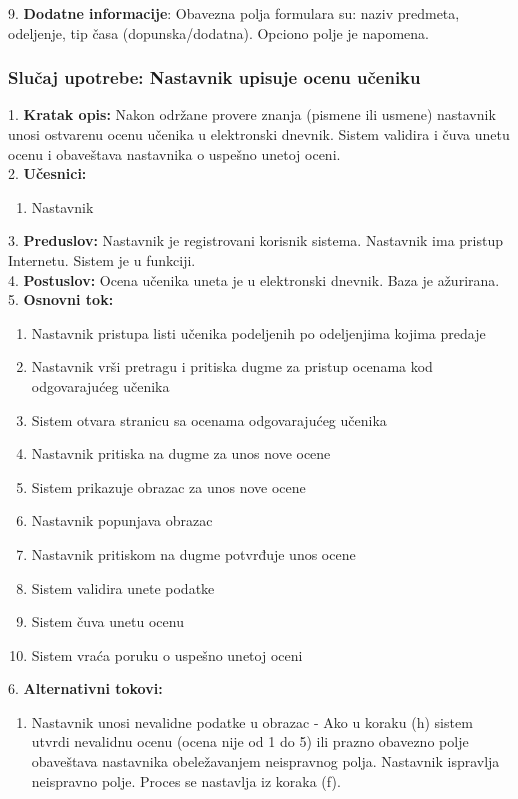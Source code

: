 \documentclass{article}
\begin{document}
9. \textbf{Dodatne informacije}: Obavezna polja formulara su: naziv predmeta, odeljenje, tip časa (dopunska/dodatna). Opciono polje je napomena. \\


\subsubsection{Slučaj upotrebe: Nastavnik upisuje ocenu učeniku} 
1. \textbf{Kratak opis:} Nakon održane provere znanja (pismene ili usmene) nastavnik unosi ostvarenu ocenu učenika u elektronski dnevnik. Sistem validira i čuva unetu ocenu i obaveštava nastavnika o uspešno unetoj oceni.  \\

2. \textbf{Učesnici:}
\begin{enumerate} [label=(\alph*)]
\item Nastavnik
\end{enumerate} 

3. \textbf{Preduslov:} Nastavnik je registrovani korisnik sistema. Nastavnik ima pristup Internetu. Sistem je u funkciji. \\

4. \textbf{Postuslov:} Ocena učenika uneta je u elektronski dnevnik. Baza je ažurirana.\\

5. \textbf{Osnovni tok:} 
\begin{enumerate} [label=(\alph*)]
\item Nastavnik pristupa listi učenika podeljenih po odeljenjima kojima predaje
\item Nastavnik vrši pretragu i pritiska dugme za pristup ocenama kod odgovarajućeg učenika
\item Sistem otvara stranicu sa ocenama odgovarajućeg učenika
\item Nastavnik pritiska na dugme za unos nove ocene
\item Sistem prikazuje obrazac za unos nove ocene
\item Nastavnik popunjava obrazac
\item Nastavnik pritiskom na dugme potvrđuje unos ocene
\item Sistem validira unete podatke
\item Sistem čuva unetu ocenu
\item Sistem vraća poruku o uspešno unetoj oceni
\end{enumerate}

6. \textbf{Alternativni tokovi:}
\begin{enumerate} [label=(\roman*)]
\item Nastavnik unosi nevalidne podatke u obrazac - Ako u koraku (h) sistem utvrdi nevalidnu ocenu (ocena nije od 1 do 5) ili prazno obavezno polje obaveštava nastavnika obeležavanjem neispravnog polja. Nastavnik ispravlja neispravno polje. Proces se nastavlja iz koraka (f).
\end{enumerate}
\end{document}
